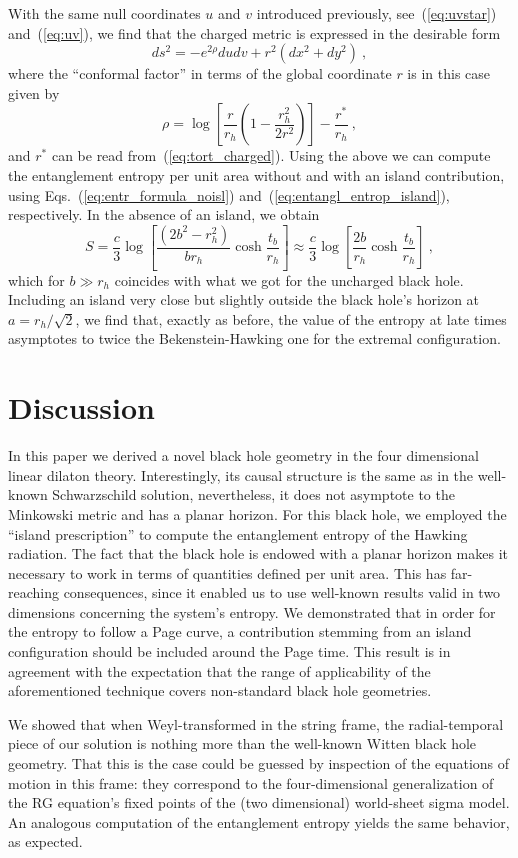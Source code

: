 \documentclass[a4paper, 12pt]{article}
\def\be{\begin{equation}}
\def\ee{\end{equation}}
\begin{document}
With the same null coordinates $u$ and $v$ introduced previously, see~(\ref{eq:uvstar}) and~(\ref{eq:uv}), we find that the charged metric is expressed in the desirable form
\be
\label{eq:uv_charged}
ds^2 = -e^{2\rho} du dv +r^2\left(dx^2+dy^2\right) \ ,
\ee
where the ``conformal factor'' in terms of the global coordinate $r$ is in this case given by
\be
\rho =  \log\left[\frac{r}{r_h}\left(1-\frac{r_h^2}{2r^2}\right)\right]-\frac{r^*}{r_h} \ ,
\ee
and $r^*$ can be read from~(\ref{eq:tort_charged}). 
Using the above we can compute the entanglement entropy per unit area without and with an island contribution,  using Eqs.~(\ref{eq:entr_formula_noisl})  and~(\ref{eq:entangl_entrop_island}), respectively. In the absence of an island, we obtain 
\be
S = \frac c 3 \log\left[ \frac{ (2b^2-r_h^2)}{b r_h} \cosh \frac{t_b}{r_h}\right]\approx \frac {c} {3} \log \left[\frac{2b}{r_h}\cosh \frac{t_b}{r_h}\right] \ ,
\ee
which for $b\gg r_h$ coincides with  what we got for the uncharged black hole. Including an island very close but slightly outside the black hole's horizon at $a=r_h/\sqrt{2}$, we find that, exactly as before, the value of the entropy at late times asymptotes to twice the Bekenstein-Hawking one for the extremal configuration. 


\section{Discussion}
\label{sec:conclusion}


In this paper we derived a novel black hole geometry in the four dimensional linear dilaton theory. Interestingly, its causal structure is the same as in the well-known Schwarzschild solution, nevertheless, it does not asymptote to the Minkowski metric and has a planar horizon. 
For this black hole, we employed the ``island prescription'' to compute the entanglement entropy of the Hawking radiation. The fact that the black hole is endowed with a planar horizon makes it necessary to work in terms of quantities defined per unit area. This has far-reaching consequences, since it enabled us to use well-known results valid in two dimensions concerning the system's entropy. We demonstrated that in order for the entropy to follow a Page curve, a contribution stemming from an island configuration should be included around the Page time. This result is in agreement with the expectation that the range of applicability of the aforementioned technique covers non-standard black hole geometries. 
 
We showed that when Weyl-transformed in the string frame, the  radial-temporal piece of our solution is nothing more than the well-known Witten black hole geometry. That this is the case could be guessed by inspection of the equations of motion in this frame: they correspond to the four-dimensional generalization of the RG equation's fixed points of the (two dimensional) world-sheet sigma model. An analogous computation of the entanglement entropy yields the same behavior, as expected.
\end{document}
